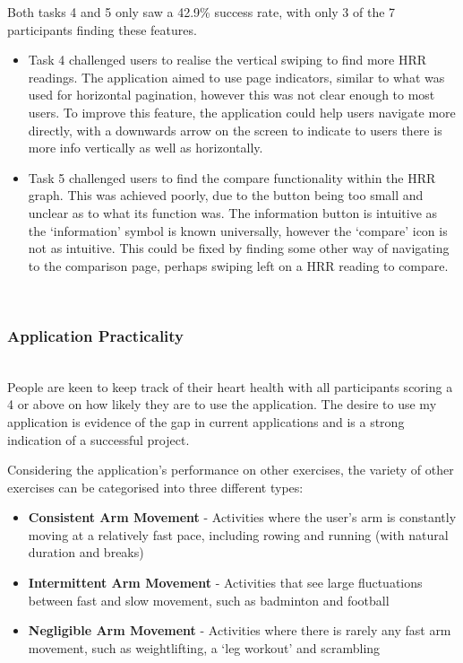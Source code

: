 \documentclass{l4proj}
\begin{document}
Both tasks 4 and 5 only saw a 42.9\% success rate, with only 3 of the 7 participants finding these features. 

\begin{itemize}
    \item Task 4 challenged users to realise the vertical swiping to find more HRR readings. The application aimed to use page indicators, similar to what was used for horizontal pagination, however this was not clear enough to most users. To improve this feature, the application could help users navigate more directly, with a downwards arrow on the screen to indicate to users there is more info vertically as well as horizontally.
    \item Task 5 challenged users to find the compare functionality within the HRR graph. This was achieved poorly, due to the button being too small and unclear as to what its function was. The information button is intuitive as the ‘information’ symbol is known universally, however the ‘compare’ icon is not as intuitive. This could be fixed by finding some other way of navigating to the comparison page, perhaps swiping left on a HRR reading to compare.
\end{itemize}

\noindent\mbox{}\\
\subsubsection{Application Practicality}
\noindent\mbox{}\\

People are keen to keep track of their heart health with all participants scoring a 4 or above on how likely they are to use the application. The desire to use my application is evidence of the gap in current applications and is a strong indication of a successful project.

Considering the application’s performance on other exercises, the variety of other exercises can be categorised into three different types:

\begin{itemize}
    \item \textbf{Consistent Arm Movement} - Activities where the user’s arm is constantly moving at a relatively fast pace, including rowing and running (with natural duration and breaks)
    \item \textbf{Intermittent Arm Movement} - Activities that see large fluctuations between fast and slow movement, such as badminton and football
    \item \textbf{Negligible Arm Movement} - Activities where there is rarely any fast arm movement, such as weightlifting, a ‘leg workout’ and scrambling
\end{itemize}
\end{document}
